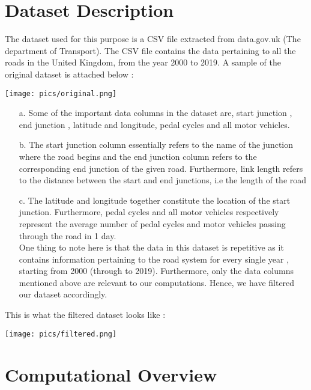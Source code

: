 \documentclass[fontsize=11pt]{IEEEtran}
\begin{document}
\section{Dataset Description}
The dataset used for this purpose is a CSV file  extracted from data.gov.uk (The department of Transport). The CSV file contains the data pertaining to all the roads in the United Kingdom, from the year 2000 to 2019. A sample of the original dataset is attached below :
\begin{center}
\texttt{[image: pics/original.png]}
\end{center}
\begin{enumerate}
   \item[a.] Some of the important data columns in the dataset are, start junction , end junction , latitude and longitude, pedal cycles and all motor vehicles. \\

   \item[b.]  The start junction column essentially refers to the name of the junction where the road begins and the end junction column refers to the corresponding end junction of the given road. Furthermore, link length refers to the distance between the start and end junctions, i.e  the length of the road\\

   \item[c.]The latitude and longitude together constitute the  location of the start junction. Furthermore, pedal cycles and all motor vehicles respectively represent  the average number of pedal cycles and motor vehicles  passing through the road in 1 day. \\


One thing to note here is that the data in this dataset is repetitive as it contains information pertaining to the road system for every single year , starting from 2000 (through to 2019). Furthermore, only the data columns mentioned above are relevant to our computations. Hence, we have filtered our dataset accordingly.\\
\end{enumerate}
\newpage
This is what the filtered dataset looks like : \\

\begin{left}
\texttt{[image: pics/filtered.png]}
\end{left}

\section{Computational Overview}
\\
\end{document}
